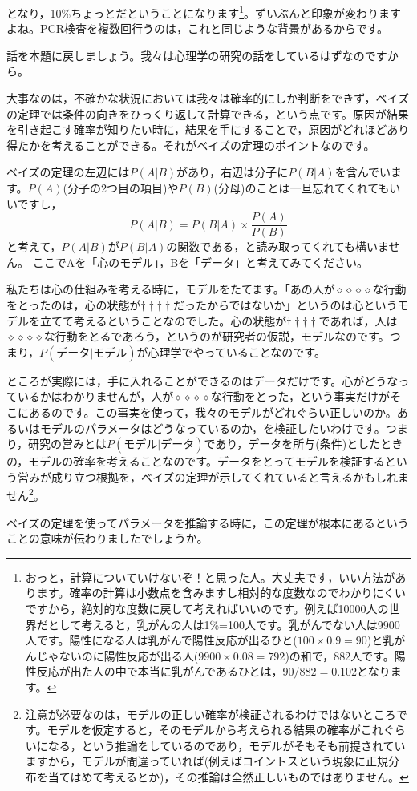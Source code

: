 となり，10\%ちょっとだということになります\footnote{おっと，計算についていけないぞ！と思った人。大丈夫です，いい方法があります。確率の計算は小数点を含みますし相対的な度数なのでわかりにくいですから，絶対的な度数に戻して考えればいいのです。例えば10000人の世界だとして考えると，乳がんの人は1\%=100人です。乳がんでない人は9900人です。陽性になる人は乳がんで陽性反応が出るひと($100\times0.9=90$)と乳がんじゃないのに陽性反応が出る人($9900\times0.08=792$)の和で，882人です。陽性反応が出た人の中で本当に乳がんであるひとは，$90/882=0.102$となります。}。ずいぶんと印象が変わりますよね。PCR検査を複数回行うのは，これと同じような背景があるからです。

話を本題に戻しましょう。我々は心理学の研究の話をしているはずなのですから。

大事なのは，不確かな状況においては我々は確率的にしか判断をできず，ベイズの定理では条件の向きをひっくり返して計算できる，という点です。原因が結果を引き起こす確率が知りたい時に，結果を手にすることで，原因がどれほどあり得たかを考えることができる。それがベイズの定理のポイントなのです。

ベイズの定理の左辺には$P(A|B)$があり，右辺は分子に$P(B|A)$を含んでいます。$P(A)$(分子の2つ目の項目)や$P(B)$(分母)のことは一旦忘れてくれてもいいですし，
\[ P(A|B) = P(B|A) \times \frac{P(A)}{P(B)}\]
と考えて，$P(A|B)$が$P(B|A)$の関数である，と読み取ってくれても構いません。
ここでAを「心のモデル」，Bを「データ」と考えてみてください。

私たちは心の仕組みを考える時に，モデルをたてます。「あの人が$\diamond\diamond\diamond\diamond$な行動をとったのは，心の状態が$\dagger\dagger\dagger\dagger$だったからではないか」というのは心というモデルを立てて考えるということなのでした。心の状態が$\dagger\dagger\dagger\dagger$であれば，人は$\diamond\diamond\diamond\diamond$な行動をとるであろう，というのが研究者の仮説，モデルなのです。つまり，$P(\mbox{データ}|\mbox{モデル})$が心理学でやっていることなのです。

ところが実際には，手に入れることができるのはデータだけです。心がどうなっているかはわかりませんが，人が$\diamond\diamond\diamond\diamond$な行動をとった，という事実だけがそこにあるのです。この事実を使って，我々のモデルがどれぐらい正しいのか。あるいはモデルのパラメータはどうなっているのか，を検証したいわけです。つまり，研究の営みとは$P(\mbox{モデル}|\mbox{データ})$であり，データを所与(条件)としたときの，モデルの確率を考えることなのです。データをとってモデルを検証するという営みが成り立つ根拠を，ベイズの定理が示してくれていると言えるかもしれません\footnote{注意が必要なのは，モデルの正しい確率が検証されるわけではないところです。モデルを仮定すると，そのモデルから考えられる結果の確率がこれぐらいになる，という推論をしているのであり，モデルがそもそも前提されていますから，モデルが間違っていれば(例えばコイントスという現象に正規分布を当てはめて考えるとか)，その推論は全然正しいものではありません。}。

ベイズの定理を使ってパラメータを推論する時に，この定理が根本にあるということの意味が伝わりましたでしょうか。

